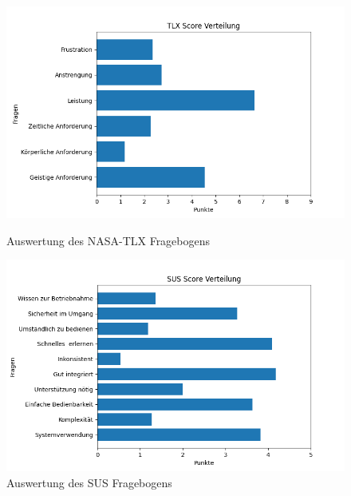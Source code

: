 \begin{figure}[ht]
    \centering
    \begin{minipage}{0.5\textwidth}
        \centering
        \includegraphics[width=\textwidth]{includes/figures/study/tlx.png}
        \caption{Auswertung des NASA-TLX Fragebogens}
        \label{fig:study_tlx}
    \end{minipage}\hfill
    \begin{minipage}{0.5\textwidth}
        \centering
        \includegraphics[width=\textwidth]{includes/figures/study/sus.png}
        \caption{Auswertung des SUS Fragebogens}
        \label{fig:study_sus}
    \end{minipage}
\end{figure}

